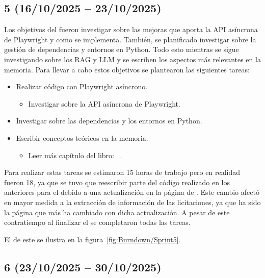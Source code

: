 \subsection{ 5 (16/10/2025 -- 23/10/2025)}
Los objetivos del  fueron investigar sobre las mejoras que aporta la API asíncrona de Playwright y como se implementa. También, se planificado investigar sobre la gestión de dependencias y entornos en Python. Todo esto mientras se sigue investigando sobre los RAG y LLM y se escriben los aspectos más relevantes en la memoria. 
Para llevar a cabo estos objetivos se plantearon las siguientes tareas:
\begin{itemize}
\tightlist
	\item Realizar código con Playwright asíncrono.
	\begin{itemize}
	\tightlist
		\item Investigar sobre la API asíncrona de Playwright.
	\end{itemize}
	\item Investigar sobre las dependencias y los entornos en Python.
	\item Escribir conceptos teóricos en la memoria.
	\begin{itemize}
	\tightlist
		\item Leer más capítulo del libro: ~\cite{book:RAG_SimpleGuide}.
	\end{itemize}
\end{itemize}

Para realizar estas tareas se estimaron 15 horas de trabajo pero en realidad fueron 18, ya que se tuvo que reescribir parte del código realizado en los  anteriores para el  debido a una actualización en la página de \contsec{}. Este cambio afectó en mayor medida a la extracción de información de las licitaciones, ya que ha sido la página que más ha cambiado con dicha actualización. A pesar de este contratiempo al finalizar el  se completaron todas las tareas.

El  de este  se ilustra en la figura~\ref{fig:Burndown/Sprint5}.

\subsection{ 6 (23/10/2025 -- 30/10/2025)}


